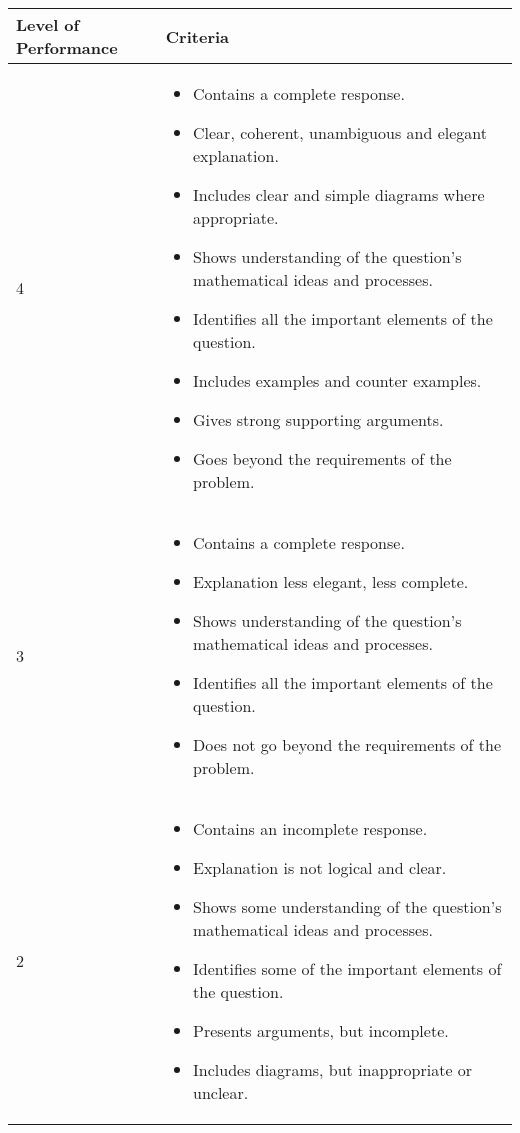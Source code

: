 \begin{table}[H]
 \begin{center}
  \begin{tabular}{|p{3cm}|p{8.5cm}|} \hline
\textbf{Level of Performance}& \textbf{Criteria} \\ \hline
4 &
\begin{itemize}[noitemsep]
\item Contains a complete response.
\item Clear, coherent, unambiguous and elegant explanation.
\item Includes clear and simple diagrams where appropriate.
\item Shows understanding of the question’s mathematical ideas and processes.
\item Identifies all the important elements of the question.
\item Includes examples and counter examples.
\item Gives strong supporting arguments.
\item Goes beyond the requirements of the problem. 
   \end{itemize} \\ \hline
3 & 
\begin{itemize}[noitemsep]
\item Contains a complete response.
\item Explanation less elegant, less complete.
\item Shows understanding of the question’s mathematical ideas and processes.
\item Identifies all the important elements of the question.
\item Does not go beyond the requirements of the problem.
\end{itemize} \\ \hline
2 &
\begin{itemize}[noitemsep]
\item Contains an incomplete response.
\item Explanation is not logical and clear.
\item Shows some understanding of the question’s mathematical ideas and processes.
\item Identifies some of the important elements of the question.
\item Presents arguments, but incomplete.
\item Includes diagrams, but inappropriate or unclear.
\end{itemize} \\ \hline

\end{tabular}
\end{center}
\end{table}
